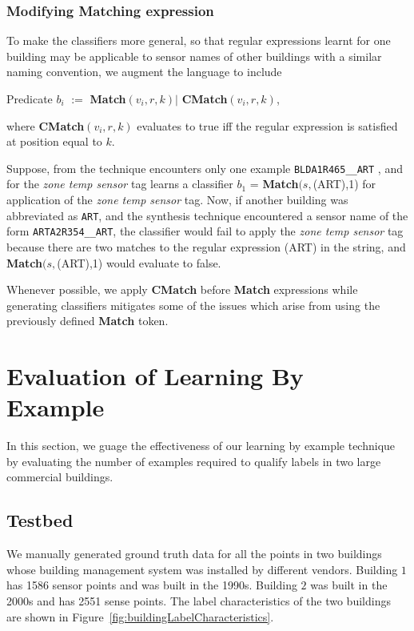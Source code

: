 \subsubsection{Modifying Matching expression}

To make the classifiers more general, so that regular expressions learnt for one building may be applicable to sensor names of other buildings with a similar naming convention, we augment the language to include 

Predicate {\bf $b_i$} $:=$ {\bf Match}$(v_i, r, k) |$  {\bf CMatch}$(v_i, r , k)$,

where  {\bf CMatch}$(v_i, r , k)$ evaluates to true iff the regular expression is satisfied at position equal to $k$. 

Suppose, from the technique encounters only one example \texttt{BLDA1R465\_\_ART} , and for the {\it zone temp sensor} tag learns a classifier $b_1$ =  {\bf Match}$(s,$(ART),1) for application of the {\it zone temp sensor} tag. Now, if another building was abbreviated as \texttt{ART}, and the synthesis technique encountered a sensor name of the form \texttt{ARTA2R354\_\_ART}, the classifier would fail to apply the {\it zone temp sensor} tag because there are two matches to the regular expression (ART) in the string, and  {\bf Match}$(s,$(ART),1) would evaluate to false.

Whenever possible, we apply {\bf CMatch} before {\bf Match} expressions while generating classifiers mitigates some of the issues which arise from using the previously defined {\bf Match} token.



\section{Evaluation of Learning By Example}
\label{sec:eval}

In this section, we guage the effectiveness of our learning by example technique by evaluating the number of examples required to qualify labels in two large commercial buildings. 

\subsection{Testbed}

We manually generated ground truth data for all the points in two buildings whose building management system was installed by different vendors. Building $1$ has 1586 sensor points and was built in the 1990s. Building $2$ was built in the 2000s and has 2551 sense points. The label characteristics of the two buildings are shown in Figure~\ref{fig:buildingLabelCharacteristics}. 

